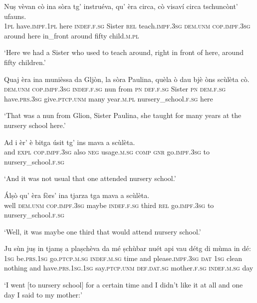 \begin{linenumbers}
\gll Nuṣ vèvan cò ina sòra tg' instruéva, qu' èra circa, cò visaví circa tschuncònt’ ufauns. \\
\textsc{1pl} have.\textsc{impf.1pl} here \textsc{indef.f.sg} Sister \textsc{rel} teach.\textsc{impf.3sg} \textsc{dem.unm} \textsc{cop.impf.3sg} around here in\_front around fifty child.\textsc{m.pl}\\
\end{linenumbers}
\medskip
\glt `Here we had a Sister who used to teach around, right in front of here, around fifty children.'
\medskip

\begin{linenumbers}
\gll Quaj èra ina munièssa da Gljòn, la sòra Paulina, quèla ò dau bjè òns scùlèta cò.\\
\textsc{dem.unm} \textsc{cop.impf.3sg} \textsc{indef.f.sg} nun from \textsc{pn} \textsc{def.f.sg} Sister \textsc{pn} \textsc{dem.f.sg}  have.\textsc{prs.3sg} give.\textsc{ptcp.unm} many year.\textsc{m.pl} nursery\_school.\textsc{f.sg} here\\
\end{linenumbers}
\medskip
\glt `That was a nun from Glion, Sister Paulina, she taught for many years at the nursery school here.'
\medskip

\begin{linenumbers}
\gll Ad i èr’ è bitga úsit tg’ ins mava a scùlèta.\\
and  \textsc{expl} \textsc{cop.impf.3sg} also \textsc{neg} usage.\textsc{m.sg}  \textsc{comp} \textsc{gnr} go.\textsc{impf.3sg} to nursery\_school.\textsc{f.sg}\\
\end{linenumbers}
\medskip
\glt `And it was not usual that one attended nursery school.'
\medskip

\largerpage
\begin{linenumbers}
\gll  Álṣò qu’ èra fòrs’ ina tjarza tga mava a scùlèta.  \\
well \textsc{dem.unm} \textsc{cop.impf.3sg} maybe \textsc{indef.f.sg} third \textsc{rel} go.\textsc{impf.3sg} to nursery\_school.\textsc{f.sg}\\
\end{linenumbers}
\medskip
\glt `Well, it was maybe one third that would attend nursery school.'

\clearpage

\begin{linenumbers}
\gll  Ju sùn juṣ in tjamṣ a plaṣchèva da mé ṣchùbar nuét api vau détg di mùma in dé: \\
 \textsc{1sg} be.\textsc{prs.1sg} go.\textsc{ptcp.m.sg} \textsc{indef.m.sg} time and please.\textsc{impf.3sg} \textsc{dat} \textsc{1sg} clean nothing and have.\textsc{prs.1sg.1sg} say.\textsc{ptcp.unm} \textsc{def.dat.sg} mother.\textsc{f.sg} \textsc{indef.m.sg} day\\
\end{linenumbers}
\medskip
\glt `I went [to nursery school] for a certain time and I didn’t like it at all and one day I said to my mother:'
\medskip

